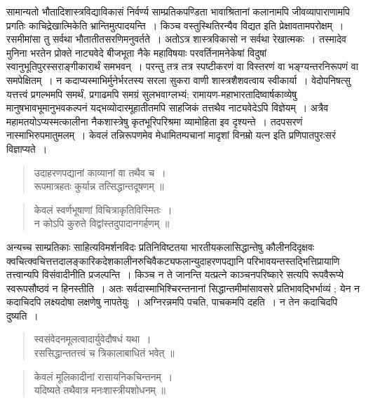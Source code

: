 {\dev सामान्यतो भौतादिशास्त्रविद्याविकासं निर्वर्ण्य साम्प्रतिकपण्डिता भावाश्रितानां कलानामपि जीवव्यापाराणामपि प्रगतिः काचिद्रेखात्मिकेति भ्रान्तिमुत्पादयन्ति~। किञ्च वस्तुस्थितिरन्यैव विद्यत इति प्रेक्षावतामपरोक्षम्~। रसमीमांसा तु सर्वथा भौतातीतसरणिमनुवर्तते~। अतोऽत्र शास्त्रविकासो न सर्वथा रेखात्मकः~। तस्मादेव मुनिना भरतेन प्रोक्ते नाट्यवेदे बीजभूता नैके महाविषयाः परवर्तिनामनेकेषां विदुषां स्वानुभूतिपुरस्सराङ्गीकारार्थं समभवन्~। परन्तु तत्र तत्र स्पष्टीकरणं वा विस्तरणं वा भङ्ग्यन्तरनिरूपणं वा समपेक्षितम्~। न कदाप्यस्माभिर्मुनेर्भरतस्य सरला सुकरा वाणी शास्त्रशैशवत्वाय स्वीकार्या~। वेदोपनिषत्सु यत्तत्त्वं प्रगल्भमपि समर्थं, प्रगाढमपि समग्रं सुलभवाग्लभ्यं; रामायण-महाभारतादिष्वार्षकाव्येषु मानुषभावभूमानुभव\-कल्पनं यद्भव्योदारमूहातीतमपि साहजिकं तत्तथैव नाट्यवेदेऽपि विज्ञेयम्~। अत्रैव महामतयोऽप्यस्मत्कालीना नैकशास्त्रेषु कृतभूरिपरिश्रमा व्यामोहिता इव दृश्यन्ते~। तदपसरणं नास्माभिरुपमातुमलम्~। केवलं तन्निरूपणमेव मेधामितम्पचानां मादृशां विनम्रो यत्न इति प्रणिपातपुरःसरं विज्ञाप्यते~।}
\begin{quote}
{\dev उदाहरणपद्यानां काव्यानां वा तथैव च~।}\\
{\dev रूपमात्रहतः कुर्यान्न तत्सिद्धान्तदूषणम् ॥}
\end{quote}
\begin{quote}
{\dev केवलं स्वर्णभूषाणां विचित्राकृतिविस्मितः~।}\\
{\dev न कोऽपि कुरुते विद्वांस्तदुपादानगर्हणम् ॥}
\end{quote}

{\dev अन्यच्च साम्प्रतिकाः साहित्यविमर्शनविदः प्रतिनिविष्टतया भारतीयकलासिद्धान्तेषु कौलीनदि\-दृक्षवः क्वचित्क्वचित्तत्तदालङ्कारिकदेशकालीनरुचिवैकट्यफलान्युदाहरणपद्यानि परिभावयन्त\-स्तद्भित्तिप्रायाणि तत्त्वान्यपि विसंवादीनीति प्रजल्पन्ति~। किञ्च न ते जानन्ति यत्प्रत्ने काञ्चन\-परिष्कारे सत्यपि रूपवैरूप्ये स्वरूपसौष्ठवं न हिनस्तीति~। अतः सर्वदास्माभिश्चिरन्तनानां सिद्धान्तमीमांसावसरे प्रतिभावद्भिर्भाव्यं ; येन न कदाचिदपि लक्ष्यदोषा लक्षणेषु नापतेयुः~। अग्निरन्नमपि पचति, पाचकमपि दहति~। न तेन कदाचिदपि दुष्यति~।}  
\begin{quote}
{\dev स्वसंवेदनमूलत्वादार्युवेदौषधं यथा~।}\\
{\dev रससिद्धान्ततत्त्वं च त्रिकालाबाधितं भवेत् ॥}
\end{quote}
\begin{quote}
{\dev केवलं मूलिकादीनां रासायनिकचिन्तनम्~।}\\
{\dev यदिष्यते तथैवात्र मनःशास्त्रीयशोधनम् ॥}
\end{quote}

